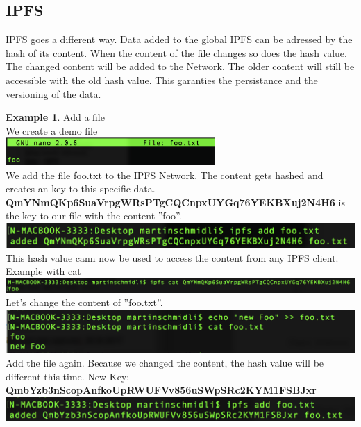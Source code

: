 \documentclass[a4paper,11pt, oneside]{report}
\theoremstyle{definition}
\newtheorem{exmp}{Example}[subsection]
\begin{document}
\subsection{IPFS}
IPFS goes a different way. Data added to the global IPFS can be adressed by the hash of its content. When the content of the file changes so does the hash value. The changed content will be added to the Network. The older content will still be accessible with the old hash value. This garanties the persistance and the versioning of the data.
\begin{exmp} Add a file\\[0.3cm]
	We create a demo file\\[0.3cm]
	\includegraphics[width=0.6\textwidth]{img/addFile01.png}\\[0.3cm]
	We add the file foo.txt to the IPFS Network. The content gets hashed and creates an key to this specific data. \textbf{QmYNmQKp6SuaVrpgWRsPTgCQCnpxUYGq76YEKBXuj2N4H6} is the key to our file with the content ''foo''.\\[0.3cm]
	\includegraphics[width=\textwidth]{img/addFile02.png}\\[0.3cm]
	This hash value cann now be used to access the content from any IPFS client. Example with cat\\[0.3cm]
	\includegraphics[width=\textwidth]{img/addFile03.png}\\[0.3cm]
	Let's change the content of ''foo.txt''.\\[0.3cm]
	\includegraphics[width=\textwidth]{img/addFile04.png}\\[0.3cm]
	Add the file again. Because we changed the content, the hash value will be different this time.
	New Key: \textbf{QmbYzb3nScopAnfkoUpRWUFVv856uSWpSRc2KYM1FSBJxr}\\[0.3cm] 
	\includegraphics[width=\textwidth]{img/addFile05.png}
\end{exmp}
\end{document}
